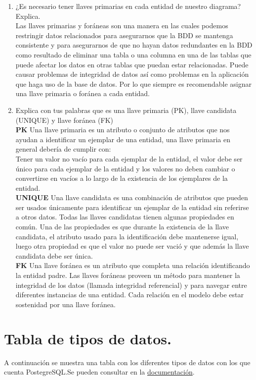 \documentclass{article}
\begin{document}
\begin{enumerate}
    \item ¿Es necesario tener llaves primarias en cada entidad de nuestro diagrama? Explica.\\
    Las llaves primarias y foráneas son una manera en las cuales podemos restringir datos relacionados para asegurarnos que la BDD se mantenga consistente y para asegurarnos de que no hayan datos redundantes en la BDD como resultado de eliminar una tabla o una columna en una de las tablas que puede afectar los datos en otras tablas que puedan estar relacionadas. Puede causar problemas de integridad de datos así como problemas en la aplicación que haga uso de la base de datos. Por lo que siempre es recomendable asignar una llave primaria o foránea a cada entidad.
    
    \item Explica con tus palabras que es una llave primaria (PK), llave candidata (UNIQUE) y llave foránea (FK)\\
    \textbf{PK} Una llave primaria es un atributo o conjunto de atributos que nos ayudan a identificar un ejemplar de una entidad, una llave primaria en general debería de cumplir con:\\
    Tener un valor no vacío para cada ejemplar de la entidad, el valor debe ser único para cada ejemplar de la entidad y los valores no deben cambiar o convertirse en vacíos a lo largo de la existencia de los ejemplares de la entidad.\\
    \textbf{UNIQUE} Una llave candidata es una combinación de atributos que pueden ser usados únicamente para identificar un ejemplar de la entidad sin referirse a otros datos. Todas las llaves candidatas tienen algunas propiedades en común. Una de las propiedades es que durante la existencia de la llave candidata, el atributo usado para la identificación debe mantenerse igual, luego otra propiedad es que el valor no puede ser vació y que además la llave candidata debe ser única.\\
    \textbf{FK} Una llave foránea es un atributo que completa una relación identificando la entidad padre. Las llaves foráneas proveen un método para mantener la integridad de los datos (llamada integridad referencial) y para navegar entre diferentes instancias de una entidad. Cada relación en el modelo debe estar sostenidad por una llave foránea.
\end{enumerate}

\section{Tabla de tipos de datos.}
A continuación se muestra una tabla con los diferentes tipos de datos con los que cuenta PostegreSQL.Se pueden consultar en la \href{https://www.postgresql.org/docs/9.2/datatype.html}{documentación}.
\end{document}
